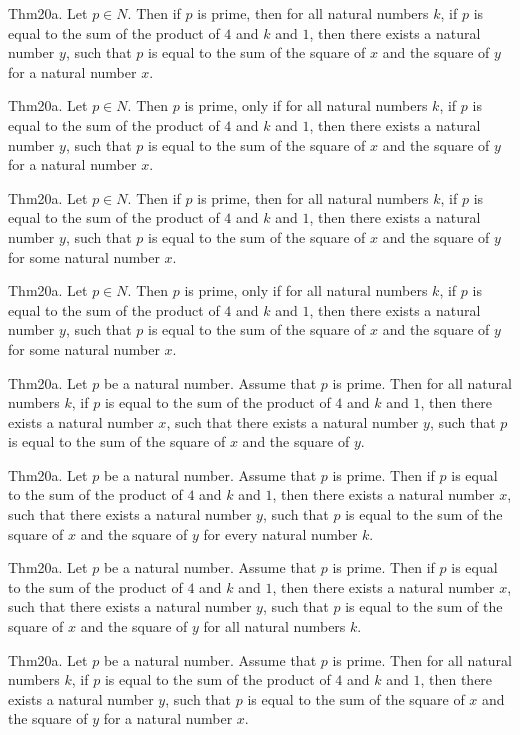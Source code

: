 \documentclass{article}
\begin{document}
Thm20a. Let $p \in N$. Then if $p$ is prime, then for all natural numbers $k$, if $p$ is equal to the sum of the product of $4$ and $k$ and $1$, then there exists a natural number $y$, such that $p$ is equal to the sum of the square of $x$ and the square of $y$ for a natural number $x$.

Thm20a. Let $p \in N$. Then $p$ is prime, only if for all natural numbers $k$, if $p$ is equal to the sum of the product of $4$ and $k$ and $1$, then there exists a natural number $y$, such that $p$ is equal to the sum of the square of $x$ and the square of $y$ for a natural number $x$.

Thm20a. Let $p \in N$. Then if $p$ is prime, then for all natural numbers $k$, if $p$ is equal to the sum of the product of $4$ and $k$ and $1$, then there exists a natural number $y$, such that $p$ is equal to the sum of the square of $x$ and the square of $y$ for some natural number $x$.

Thm20a. Let $p \in N$. Then $p$ is prime, only if for all natural numbers $k$, if $p$ is equal to the sum of the product of $4$ and $k$ and $1$, then there exists a natural number $y$, such that $p$ is equal to the sum of the square of $x$ and the square of $y$ for some natural number $x$.

Thm20a. Let $p$ be a natural number. Assume that $p$ is prime. Then for all natural numbers $k$, if $p$ is equal to the sum of the product of $4$ and $k$ and $1$, then there exists a natural number $x$, such that there exists a natural number $y$, such that $p$ is equal to the sum of the square of $x$ and the square of $y$.

Thm20a. Let $p$ be a natural number. Assume that $p$ is prime. Then if $p$ is equal to the sum of the product of $4$ and $k$ and $1$, then there exists a natural number $x$, such that there exists a natural number $y$, such that $p$ is equal to the sum of the square of $x$ and the square of $y$ for every natural number $k$.

Thm20a. Let $p$ be a natural number. Assume that $p$ is prime. Then if $p$ is equal to the sum of the product of $4$ and $k$ and $1$, then there exists a natural number $x$, such that there exists a natural number $y$, such that $p$ is equal to the sum of the square of $x$ and the square of $y$ for all natural numbers $k$.

Thm20a. Let $p$ be a natural number. Assume that $p$ is prime. Then for all natural numbers $k$, if $p$ is equal to the sum of the product of $4$ and $k$ and $1$, then there exists a natural number $y$, such that $p$ is equal to the sum of the square of $x$ and the square of $y$ for a natural number $x$.
\end{document}
